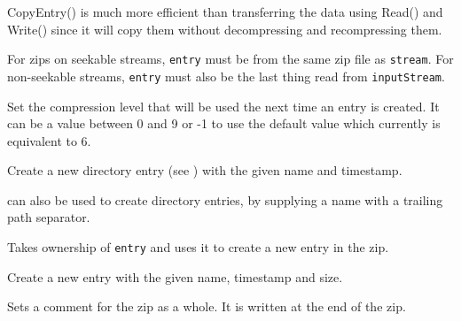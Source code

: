 CopyEntry() is much more efficient than transferring the data using
Read() and Write() since it will copy them without decompressing and
recompressing them.

For zips on seekable streams, {\tt entry} must be from the same zip file
as {\tt stream}. For non-seekable streams, {\tt entry} must also be the
last thing read from {\tt inputStream}.


\label{wxzipoutputstreamlevel}



Set the compression level that will be used the next time an entry is
created. It can be a value between 0 and 9 or -1 to use the default value
which currently is equivalent to 6.


\label{wxzipoutputstreamputnextdirentry}


Create a new directory entry
(see )
with the given name and timestamp.

 can
also be used to create directory entries, by supplying a name with
a trailing path separator.


\label{wxzipoutputstreamputnextentry}


Takes ownership of {\tt entry} and uses it to create a new entry
in the zip. 


Create a new entry with the given name, timestamp and size.


\label{wxzipoutputstreamsetcomment}


Sets a comment for the zip as a whole. It is written at the end of the
zip.

